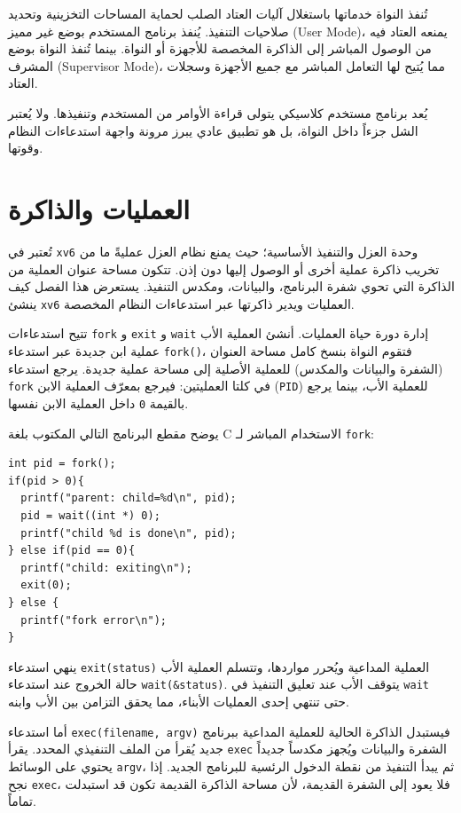 تُنفذ النواة خدماتها باستغلال آليات العتاد الصلب لحماية المساحات التخزينية وتحديد صلاحيات التنفيذ.
يُنفذ برنامج المستخدم بوضع غير مميز (User Mode)، يمنعه العتاد فيه من الوصول المباشر إلى الذاكرة المخصصة للأجهزة أو النواة.
بينما تُنفذ النواة بوضع المشرف (Supervisor Mode)، مما يُتيح لها التعامل المباشر مع جميع الأجهزة وسجلات العتاد.

يُعد  برنامج مستخدم كلاسيكي يتولى قراءة الأوامر من المستخدم وتنفيذها.
ولا يُعتبر الشل جزءاً داخل النواة، بل هو تطبيق عادي يبرز مرونة واجهة استدعاءات النظام وقوتها.

\section{العمليات والذاكرة}

تُعتبر  في \texttt{xv6} وحدة العزل والتنفيذ الأساسية؛
حيث يمنع نظام العزل عمليةً ما من تخريب ذاكرة عملية أخرى أو الوصول إليها دون إذن.
تتكون مساحة عنوان العملية من الذاكرة التي تحوي شفرة البرنامج، والبيانات، ومكدس التنفيذ.
يستعرض هذا الفصل كيف ينشئ \texttt{xv6} العمليات ويدير ذاكرتها عبر استدعاءات النظام المخصصة.

تتيح استدعاءات \texttt{fork} و \texttt{exit} و \texttt{wait} إدارة دورة حياة العمليات.
أنشئ العملية الأب عملية ابن جديدة عبر استدعاء \texttt{fork()}،
فتقوم النواة بنسخ كامل مساحة العنوان (الشفرة والبيانات والمكدس) للعملية الأصلية إلى مساحة عملية جديدة.
يرجع استدعاء \texttt{fork} في كلتا العمليتين:
فيرجع بمعرّف العملية الابن (\texttt{PID}) للعملية الأب، بينما يرجع بالقيمة \texttt{0} داخل العملية الابن نفسها.

يوضح مقطع البرنامج التالي المكتوب بلغة C الاستخدام المباشر لـ \texttt{fork}:

\begin{lstlisting}
int pid = fork();
if(pid > 0){
  printf("parent: child=%d\n", pid);
  pid = wait((int *) 0);
  printf("child %d is done\n", pid);
} else if(pid == 0){
  printf("child: exiting\n");
  exit(0);
} else {
  printf("fork error\n");
}
\end{lstlisting}

ينهي استدعاء \texttt{exit(status)} العملية المداعية ويُحرر مواردها، وتتسلم العملية الأب حالة الخروج عند استدعاء \texttt{wait(\&status)}.
يتوقف الأب عند تعليق التنفيذ في \texttt{wait} حتى تنتهي إحدى العمليات الأبناء، مما يحقق التزامن بين الأب وابنه.

أما استدعاء \texttt{exec(filename, argv)} فيستبدل الذاكرة الحالية للعملية المداعية ببرنامج جديد يُقرأ من الملف التنفيذي المحدد.
يقرأ \texttt{exec} الشفرة والبيانات ويُجهز مكدساً جديداً يحتوي على الوسائط \texttt{argv}، ثم يبدأ التنفيذ من نقطة الدخول الرئسية للبرنامج الجديد.
إذا نجح \texttt{exec}، فلا يعود إلى الشفرة القديمة، لأن مساحة الذاكرة القديمة تكون قد استبدلت تماماً.

